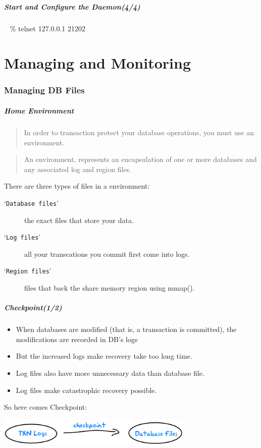 \documentclass{beamer}
\newcommand{\command}[1]{`\texttt{#1}'}
\newcommand{\mypart}[1]{\part{#1}\frame{\partpage \tableofcontents}}
\newcommand{\mysection}[1]{\section{#1}\frame{\frametitle{#1}\tableofcontents[sectionstyle=show/shaded,subsectionstyle=show/shaded/shaded]}}
\begin{document}
\begin{frame}[fragile]
\frametitle{Start and Configure the Daemon(4/4)}
\begin{block}{}
\begin{semiverbatim}
~ \% \alert<1>{telnet 127.0.0.1 21202}
\uncover<2->{\alert<2>{Trying 127.0.0.1...
Connected to 127.0.0.1.
Escape character is '^]'.}}
\end{semiverbatim}
\end{block}
\end{frame}

\mypart{Managing and Monitoring}
\mysection{Managing DB Files}

\begin{frame}
\frametitle{Home Environment}
\begin{quote}In order to transaction protect your database operations, you must use an environment. \end{quote}
\begin{quote}An environment, represents an encapsulation of one or more databases and any associated log and region files. \end{quote}
There are three types of files in a environment:
\begin{description}
\item[\command{Database files}]
  the exact files that store your data.
\item[\command{Log files}]
  all your transcations you commit first come into logs.
\item[\command{Region files}]
  files that back the share memory region using mmap().
\end{description}
\end{frame}

\begin{frame}
\frametitle{Checkpoint(1/2)}
\begin{itemize}
\item When databases are modified (that is, a transaction is committed), the modifications are recorded in DB's logs
\item But the increased logs make recovery take too long time.
\item Log files also have more unnecessary data than database file.
\item Log files make catastrophic recovery possible.
\end{itemize}

So here comes Checkpoint:
\begin{center}
\includegraphics[scale=1,width=0.70\textwidth]{checkpoint.png}
\end{center}
\end{frame}
\end{document}
